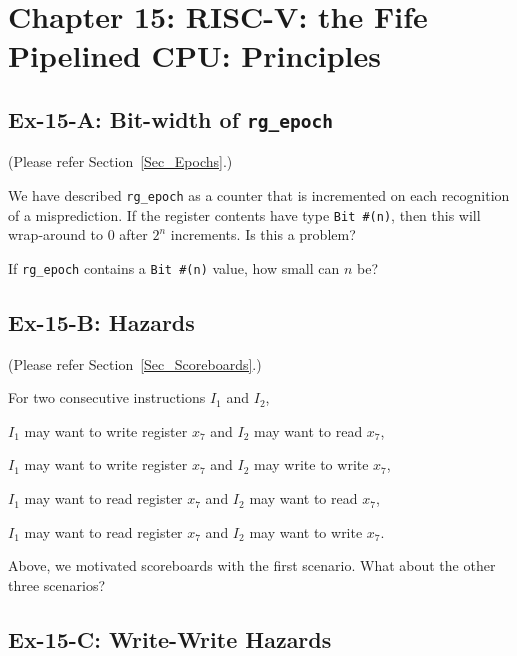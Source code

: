 \section*{Chapter 15: RISC-V: the Fife Pipelined CPU: Principles}


\subsection*{Ex-15-A: Bit-width of {\tt rg\_epoch}}
\label{Ex-15-A-Epoch-Bitwidth}

(Please refer Section~\ref{Sec_Epochs}.)

We have described \verb|rg_epoch| as a counter that is incremented on
each recognition of a misprediction.  If the register contents have
type \verb|Bit #(n)|, then this will wrap-around to 0 after $2^n$
increments.  Is this a problem?

If \verb|rg_epoch| contains a \verb|Bit #(n)| value, how small can $n$ be?


\subsection*{Ex-15-B: Hazards}
\label{Ex-15-B-Hazards}

(Please refer Section~\ref{Sec_Scoreboards}.)

For two consecutive instructions $I_1$ and $I_2$,
  \begin{tightlist}
    \item $I_1$ may want to write register $x_7$ and $I_2$ may want to read $x_7$,
    \item $I_1$ may want to write register $x_7$ and $I_2$ may write to write $x_7$,
    \item $I_1$ may want to read register $x_7$ and $I_2$ may want to read $x_7$,
    \item $I_1$ may want to read register $x_7$ and $I_2$ may want to write $x_7$.
  \end{tightlist}
Above, we motivated scoreboards with the first scenario.  What about
the other three scenarios?


\subsection*{Ex-15-C: Write-Write Hazards}
\label{Ex-15-C-Write-Write-Hazards}

